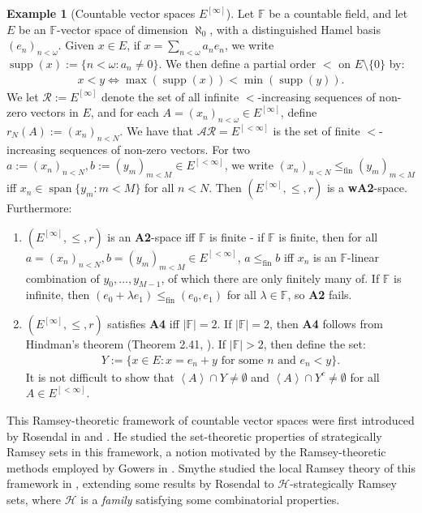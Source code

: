\documentclass[11pt,reqno]{amsart}
\theoremstyle{plain}
\numberwithin{equation}{section}
\theoremstyle{definition}
\newtheorem{example}[theorem]{Example}
\newcommand{\func}{\operatorname}
\renewcommand{\c}[1]{\left\langle #1 \right\rangle}
\newcommand{\cal}{\mathcal}
\newcommand{\supp}{\func{supp}}
\renewcommand{\H}{\cal{H}}
\newcommand{\fin}{\mathrm{fin}}
\begin{document}
\begin{example}[Countable vector spaces $E^{[\infty]}$]
\label{ex:vector.spaces}
    Let $\mathbb{F}$ be a countable field, and let $E$ be an $\mathbb{F}$-vector space of dimension $\aleph_0$, with a distinguished Hamel basis $(e_n)_{n<\omega}$. Given $x \in E$, if $x = \sum_{n<\omega} a_ne_n$, we write $\supp(x) := \{n < \omega : a_n \neq 0\}$. We then define a partial order $<$ on $E \setminus \{0\}$ by:
    \begin{align*}
        x < y \iff \max(\supp(x)) < \min(\supp(y)).
    \end{align*}
    We let $\cal{R} := E^{[\infty]}$ denote the set of all infinite $<$-increasing sequences of non-zero vectors in $E$, and for each $A = (x_n)_{n<\omega} \in E^{[\infty]}$, define $r_N(A) := (x_n)_{n<N}$. We have that $\cal{AR} = E^{[<\infty]}$ is the set of finite $<$-increasing sequences of non-zero vectors. For two $a := (x_n)_{n<N}, b := (y_m)_{m<M} \in E^{[<\infty]}$, we write $(x_n)_{n<N} \leq_\fin (y_m)_{m<M}$ iff $x_n \in \func{span}\{y_m : m < M\}$ for all $n < N$. Then $(E^{[\infty]},\leq,r)$ is a \textbf{wA2}-space. Furthermore:
    \begin{enumerate}
        \item $(E^{[\infty]},\leq,r)$ is an \textbf{A2}-space iff $\mathbb{F}$ is finite - if $\mathbb{F}$ is finite, then for all $a = (x_n)_{n<N},b = (y_m)_{m<M} \in E^{[<\infty]}$, $a \leq_\fin b$ iff $x_n$ is an $\mathbb{F}$-linear combination of $y_0,\dots,y_{M-1}$, of which there are only finitely many of. If $\mathbb{F}$ is infinite, then $(e_0 + \lambda e_1) \leq_\fin (e_0,e_1)$ for all $\lambda \in \mathbb{F}$, so \textbf{A2} fails.
        
        \item $(E^{[\infty]},\leq,r)$ satisfies \textbf{A4} iff $|\mathbb{F}| = 2$. If $|\mathbb{F}| = 2$, then \textbf{A4} follows from Hindman's theorem (Theorem 2.41, \cite{T10}). If $|\mathbb{F}| > 2$, then define the set:
        \begin{align*}
            Y := \{x \in E : \text{$x = e_n + y$ for some $n$ and $e_n < y$}\}.
        \end{align*}
        It is not difficult to show that $\c{A} \cap Y \neq \emptyset$ and $\c{A} \cap Y^c \neq \emptyset$ for all $A \in E^{[<\infty]}$.
    \end{enumerate} 
    This Ramsey-theoretic framework of countable vector spaces were first introduced by Rosendal in \cite{R08} and \cite{R09}. He studied the set-theoretic properties of strategically Ramsey sets in this framework, a notion motivated by the Ramsey-theoretic methods employed by Gowers in \cite{G02}. Smythe studied the local Ramsey theory of this framework in \cite{S18}, extending some results by Rosendal to $\H$-strategically Ramsey sets, where $\H$ is a \emph{family} satisfying some combinatorial properties.
\end{example}
\end{document}

